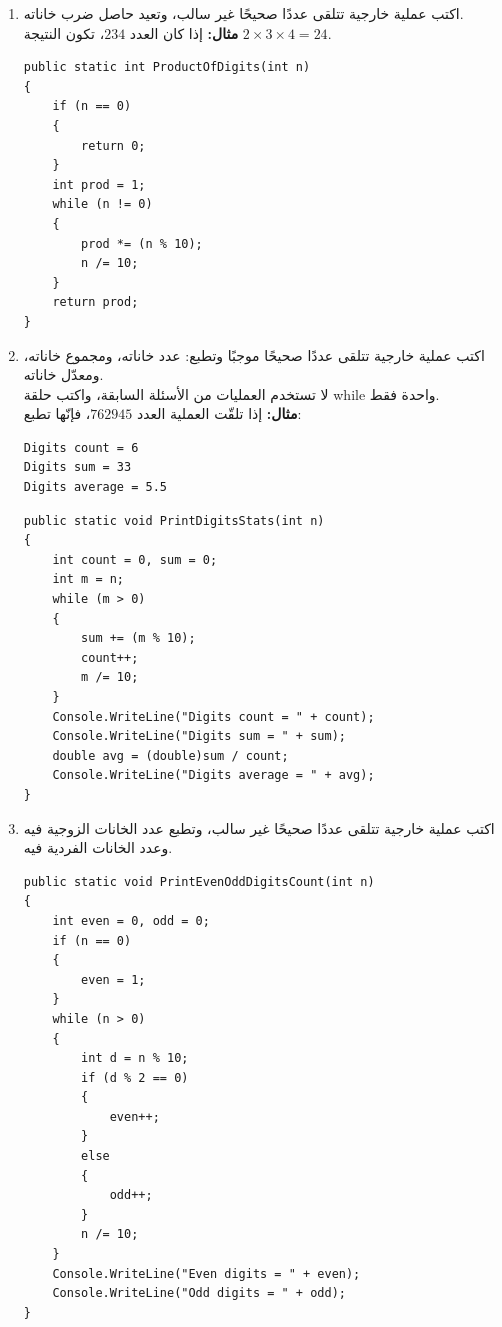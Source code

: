 \documentclass[14pt]{extarticle}
\begin{document}
\begin{enumerate}[itemsep=2em]
\item اكتب عملية خارجية تتلقى عددًا صحيحًا غير سالب، وتعيد حاصل ضرب خاناته. \\
\textbf{مثال:} إذا كان العدد $234$، تكون النتيجة $2 \times 3 \times 4 = 24$.
\ifwithsols
\begin{boxSolution}
\begin{english}
\begin{verbatim}
public static int ProductOfDigits(int n)
{
    if (n == 0)
    {
        return 0;
    }
    int prod = 1;
    while (n != 0)
    {
        prod *= (n % 10);
        n /= 10;
    }
    return prod;
}
\end{verbatim}
\end{english}
\end{boxSolution}
\fi
\filbreak

\item اكتب عملية خارجية تتلقى عددًا صحيحًا موجبًا وتطبع: عدد خاناته، ومجموع خاناته، ومعدّل خاناته. \\
لا تستخدم العمليات من الأسئلة السابقة، واكتب حلقة \textenglish{while} واحدة فقط. \\
\textbf{مثال:} إذا تلقّت العملية العدد $762945$، فإنّها تطبع:
\begin{boxCode}
\begin{english}
\begin{verbatim}
Digits count = 6
Digits sum = 33
Digits average = 5.5
\end{verbatim}
\end{english}
\end{boxCode}
\ifwithsols
\begin{boxSolution}
\begin{english}
\begin{verbatim}
public static void PrintDigitsStats(int n)
{
    int count = 0, sum = 0;
    int m = n;
    while (m > 0)
    {
        sum += (m % 10);
        count++;
        m /= 10;
    }
    Console.WriteLine("Digits count = " + count);
    Console.WriteLine("Digits sum = " + sum);
    double avg = (double)sum / count;
    Console.WriteLine("Digits average = " + avg);
}
\end{verbatim}
\end{english}
\end{boxSolution}
\fi
\filbreak

\item اكتب عملية خارجية تتلقى عددًا صحيحًا غير سالب، وتطبع عدد الخانات الزوجية فيه وعدد الخانات الفردية فيه.
\ifwithsols
\begin{boxSolution}
\begin{english}
\begin{verbatim}
public static void PrintEvenOddDigitsCount(int n)
{
    int even = 0, odd = 0;
    if (n == 0)
    {
        even = 1;
    }
    while (n > 0)
    {
        int d = n % 10;
        if (d % 2 == 0)
        {
            even++;
        }
        else
        {
            odd++;
        }
        n /= 10;
    }
    Console.WriteLine("Even digits = " + even);
    Console.WriteLine("Odd digits = " + odd);
}
\end{verbatim}
\end{english}
\end{boxSolution}
\fi
\filbreak


\end{enumerate}
\end{document}
